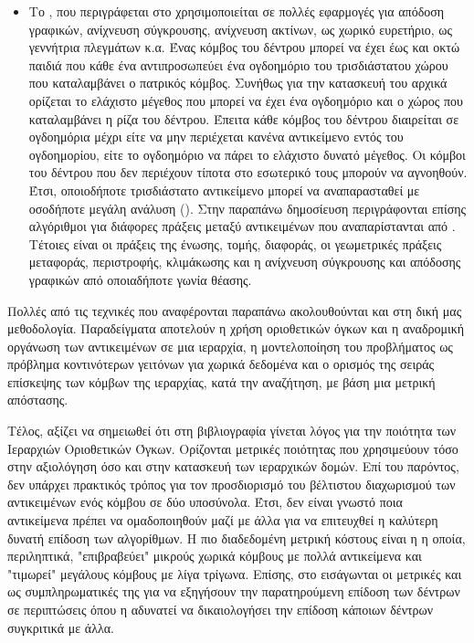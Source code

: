 \begin{itemize}
    \item Το , που περιγράφεται στο \cite{meagher1982geometric}
    χρησιμοποιείται σε πολλές εφαρμογές για απόδοση γραφικών, ανίχνευση σύγκρουσης, 
    ανίχνευση ακτίνων, ως χωρικό ευρετήριο, ως γεννήτρια πλεγμάτων κ.α. 
    Ένας κόμβος του δέντρου μπορεί να έχει έως και οκτώ παιδιά που κάθε ένα
    αντιπροσωπεύει ένα ογδοημόριο του τρισδιάστατου χώρου που καταλαμβάνει ο 
    πατρικός κόμβος.
    Συνήθως για την κατασκευή του αρχικά ορίζεται το ελάχιστο μέγεθος που μπορεί να 
    έχει ένα ογδοημόριο και ο χώρος που καταλαμβάνει η ρίζα του δέντρου. 
    Έπειτα κάθε κόμβος του  δέντρου 
    διαιρείται σε ογδοημόρια μέχρι είτε να μην περιέχεται κανένα αντικείμενο 
    εντός του ογδοημορίου, είτε το ογδοημόριο να πάρει το ελάχιστο δυνατό μέγεθος.
    Οι κόμβοι του δέντρου που δεν περιέχουν τίποτα στο εσωτερικό τους μπορούν να αγνοηθούν.
    Έτσι, οποιοδήποτε τρισδιάστατο αντικείμενο μπορεί να αναπαρασταθεί με οσοδήποτε 
    μεγάλη ανάλυση ().
    Στην παραπάνω δημοσίευση περιγράφονται επίσης αλγόριθμοι για διάφορες πράξεις μεταξύ 
    αντικειμένων που αναπαρίστανται από .
    Τέτοιες είναι οι πράξεις της ένωσης, τομής, διαφοράς, οι γεωμετρικές πράξεις 
    μεταφοράς, περιστροφής, κλιμάκωσης και η ανίχνευση σύγκρουσης και απόδοσης γραφικών 
    από οποιαδήποτε γωνία θέασης. 
\end{itemize}

Πολλές από τις τεχνικές που αναφέρονται παραπάνω ακολουθούνται και 
στη δική μας μεθοδολογία.
Παραδείγματα αποτελούν η χρήση οριοθετικών όγκων και η αναδρομική οργάνωση 
των αντικειμένων σε μια ιεραρχία, η μοντελοποίηση του προβλήματος 
ως πρόβλημα κοντινότερων γειτόνων για χωρικά δεδομένα και ο 
ορισμός της σειράς επίσκεψης των κόμβων της ιεραρχίας, κατά την αναζήτηση, με 
βάση μια μετρική απόστασης.

Τέλος, αξίζει να σημειωθεί ότι στη βιβλιογραφία γίνεται λόγος για την 
ποιότητα των Ιεραρχιών Οριοθετικών Όγκων. 
Ορίζονται μετρικές ποιότητας που χρησιμεύουν τόσο στην αξιολόγηση όσο 
και στην κατασκευή των ιεραρχικών δομών.
Επί του παρόντος, δεν υπάρχει πρακτικός τρόπος για τον προσδιορισμό 
του βέλτιστου διαχωρισμού των αντικειμένων ενός κόμβου σε δύο υποσύνολα.
Έτσι, δεν είναι γνωστό ποια αντικείμενα πρέπει να ομαδοποιηθούν μαζί
με άλλα για να επιτευχθεί η καλύτερη δυνατή επίδοση των αλγορίθμων.
Η πιο διαδεδομένη μετρική κόστους είναι η 
\textit{} 
\cite{goldsmith1987automatic} \cite{macdonald1990heuristics}
η οποία, περιληπτικά, "επιβραβεύει" μικρούς χωρικά κόμβους με πολλά 
αντικείμενα και "τιμωρεί" μεγάλους κόμβους με λίγα τρίγωνα. 
Επίσης, στο \cite{aila2013quality} εισάγωνται οι μετρικές 
 και 
 ως συμπληρωματικές 
της  για να εξηγήσουν την παρατηρούμενη επίδοση 
των δέντρων σε περιπτώσεις όπου η  αδυνατεί να 
δικαιολογήσει την επίδοση κάποιων δέντρων συγκριτικά 
με άλλα.

